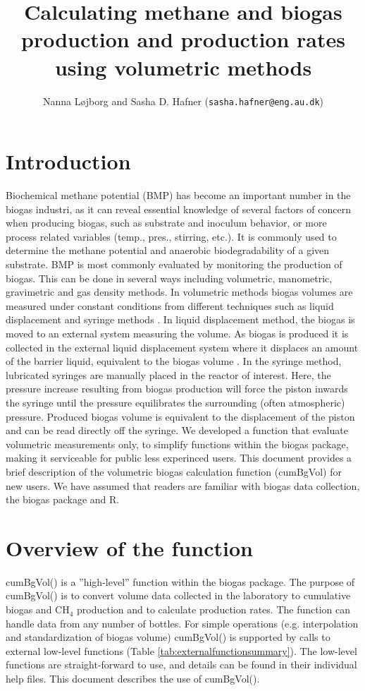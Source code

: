 \documentclass{article}
\title{Calculating methane and biogas production and production rates using volumetric  methods}
\author{Nanna Løjborg and Sasha D. Hafner (\texttt{sasha.hafner@eng.au.dk})}
\begin{document}


\maketitle

\section{Introduction}
Biochemical methane potential (BMP) has become an important number in the biogas industri, as it can reveal essential knowledge of several factors of concern when producing biogas, such as substrate and inoculum behavior, or more process related variables (temp., pres., stirring, etc.). It is commonly used to determine the methane potential and anaerobic biodegradability of a given substrate. 
BMP is most commonly evaluated by monitoring the production of biogas. This can be done in several ways including volumetric, manometric, gravimetric and gas density methods. In volumetric methods biogas volumes are measured under constant conditions from different techniques such as liquid displacement and syringe methods . In liquid displacement method, the biogas is moved to an external system measuring the volume. As biogas is produced it is collected in the external liquid displacement system where it displaces an amount of the barrier liquid, equivalent to the biogas volume .  In the syringe method, lubricated syringes are manually placed in the reactor of interest. Here, the pressure increase resulting from biogas production will force the piston inwards the syringe until the pressure equilibrates the surrounding (often atmospheric) pressure. Produced biogas volume is equivalent to the displacement of the piston and can be read directly off the syringe.   
We developed a function that evaluate volumetric measurements only, to simplify functions within the biogas package, making it serviceable for public less experinced users. 
This document provides a brief description of the volumetric biogas calculation function (cumBgVol) for new users.
We have assumed that readers are familiar with biogas data collection, the biogas package and R.

\section{Overview of the function}
cumBgVol() is a ''high-level'' function within the biogas package. The purpose of cumBgVol() is to convert volume data collected in the laboratory to cumulative biogas and CH$_4$ production and to calculate production rates. The function can handle data from any number of bottles. For simple operations (e.g. interpolation and standardization of biogas volume) cumBgVol() is supported by calls to external low-level functions (Table \ref{tab:externalfunctionsummary}). The low-level functions are straight-forward to use, and details can be found in their individual help files.
This document describes the use of cumBgVol(). 
\end{document}

